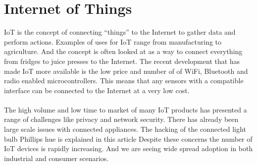 \documentclass[]{uiophd}
\begin{document}
\section{Internet of Things}
IoT is the concept of connecting “things” to the Internet to gather data and perform actions. Examples of uses for IoT range from manufacturing to agriculture. And the concept is often looked at as a way to connect everything from fridges to juice presses to the Internet. The recent development that has made IoT more available is the low price and number of of WiFi, Bluetooth and radio enabled microcontrollers.  This means that any sensors with a compatible interface can be connected to the Internet at a very low cost.
\\\\
The high volume and low time to market of many IoT products has presented a range of challenges like privacy and network security. There has already been large scale issues with connected appliances. The hacking of the connected light bulb Phillips hue is explained in this article \cite{6997469} Despite these concerns the number of IoT devices is rapidly increasing. And we are seeing wide spread adoption in both industrial and consumer scenarios. 
\end{document}
